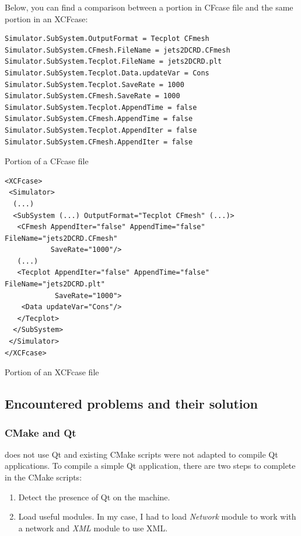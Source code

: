 Below, you can find a comparison between a portion in CFcase file and
the same portion in an XCFcase: \\

\begin{table}[H]
 \begin{lstlisting}
Simulator.SubSystem.OutputFormat = Tecplot CFmesh
Simulator.SubSystem.CFmesh.FileName = jets2DCRD.CFmesh
Simulator.SubSystem.Tecplot.FileName = jets2DCRD.plt
Simulator.SubSystem.Tecplot.Data.updateVar = Cons
Simulator.SubSystem.Tecplot.SaveRate = 1000
Simulator.SubSystem.CFmesh.SaveRate = 1000
Simulator.SubSystem.Tecplot.AppendTime = false
Simulator.SubSystem.CFmesh.AppendTime = false
Simulator.SubSystem.Tecplot.AppendIter = false
Simulator.SubSystem.CFmesh.AppendIter = false
 \end{lstlisting}
 \caption{Portion of a CFcase file}
\end{table}

\begin{table}[H]
\begin{lstlisting}
<XCFcase>
 <Simulator>
  (...)
  <SubSystem (...) OutputFormat="Tecplot CFmesh" (...)>
   <CFmesh AppendIter="false" AppendTime="false" FileName="jets2DCRD.CFmesh"
           SaveRate="1000"/>
   (...)
   <Tecplot AppendIter="false" AppendTime="false" FileName="jets2DCRD.plt"
            SaveRate="1000">
    <Data updateVar="Cons"/>
   </Tecplot>
  </SubSystem>
 </Simulator>
</XCFcase>
\end{lstlisting}
 \caption{Portion of an XCFcase file}
\end{table}



\subsection{Encountered problems and their solution}

\subsubsection{CMake and Qt}

\cf does not use Qt and existing CMake scripts were not adapted to compile Qt
applications. To compile a simple Qt application, there are two steps to
complete in the CMake scripts:
\begin{enumerate}
 \item Detect the presence of Qt on the machine.
 \item Load useful modules. In my case, I had to load \textit{Network} module
to work with a network and \textit{XML} module to use XML.
\end{enumerate}

